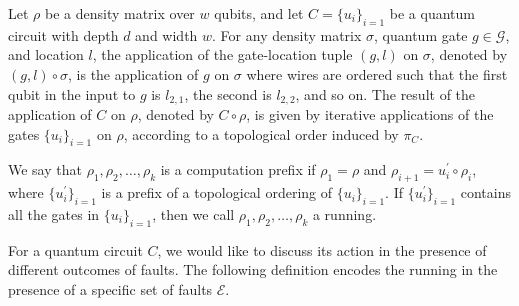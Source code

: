 \begin{definition}
  Let $\rho$ be a density matrix over $w$ qubits, and let $C = \{u_{i}\}_{i=1}$ be a quantum circuit with depth $d$ and width $w$. For any density matrix $\sigma$, quantum gate $g \in \mathcal{G}$, and location $l$, the application of the gate-location tuple $(g,l)$ on $\sigma$, denoted by $(g,l) \circ \sigma$, is the application of $g$ on $\sigma$ where wires are ordered such that the first qubit in the input to $g$ is $l_{2,1}$, the second is $l_{2,2}$, and so on. The result of the application of $C$ on $\rho$, denoted by $C \circ \rho$, is given by iterative applications of the gates $\{u_{i}\}_{i=1}$ on $\rho$, according to a topological order induced by $\pi_{C}$.

We say that $\rho_{1}, \rho_{2}, \ldots, \rho_{k}$ is a computation prefix if $\rho_{1} = \rho$ and $\rho_{i+1} = u^\prime_{i} \circ \rho_{i}$, where $\{u^{\prime}_{i}\}_{i=1}$ is a prefix of a topological ordering of $\{u_{i}\}_{i=1}$. If $\{u^{\prime}_{i}\}_{i=1}$ contains all the gates in $\{u_{i}\}_{i=1}$, then we call $\rho_{1}, \rho_{2}, \ldots, \rho_{k}$ a running.
\end{definition}
For a quantum circuit $C$, we would like to discuss its action in the presence of different outcomes of faults. The following definition encodes the running in the presence of a specific set of faults $\mathcal{E}$.
